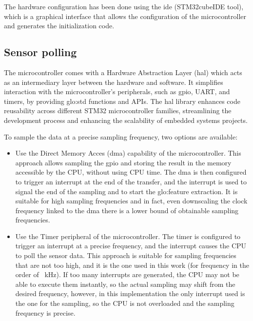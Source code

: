 The hardware configuration has been done using the \gls{ide} ({STM32cubeIDE} tool), which is a graphical interface that allows the configuration of the microcontroller and generates the initialization code. 

\subsection{Sensor polling}
The microcontroller comes with a Hardware Abstraction Layer (\gls{hal}) which acts as an intermediary layer between the hardware and software. It simplifies interaction with the microcontroller's peripherals, such as \gls{gpio}, UART, and timers, by providing \gls{glo:std} functions and APIs. The \gls{hal} library enhances code reusability across different STM32 microcontroller families, streamlining the development process and enhancing the scalability of embedded systems projects.

To sample the data at a precise sampling frequency, two options are available:
\begin{itemize}
    \item Use the Direct Memory Acces (\gls{dma}) capability of the microcontroller. This approach allows sampling the \gls{gpio} and storing the result in the memory accessible by the CPU, without using CPU time. The \gls{dma} is then configured to trigger an interrupt at the end of the transfer, and the interrupt is used to signal the end of the sampling and to start the \gls{glo:feature} extraction. It is suitable for high sampling frequencies and in fact, even downscaling the clock frequency linked to the \gls{dma} there is a lower bound of obtainable sampling frequencies.
    \item Use the Timer peripheral of the microcontroller. The timer is configured to trigger an interrupt at a precise frequency, and the interrupt causes the CPU to poll the sensor data. This approach is suitable for sampling frequencies that are not too high, and it is the one used in this work (for frequency in the order of \SI{ }{\kilo\hertz}).
    If too many interrupts are generated, the CPU may not be able to execute them instantly, so the actual sampling may shift from the desired frequency, however, in this implementation the only interrupt used is the one for the sampling, so the CPU is not overloaded and the sampling frequency is precise.
\end{itemize}


